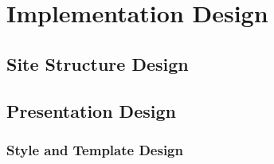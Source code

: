 \documentclass[a4paper]{report}
\begin{document}
\chapter{Implementation Design}
\section{Site Structure Design}
\section{Presentation Design}
\subsection{Style and Template Design}
\end{document}
